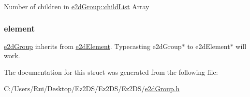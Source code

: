 Number of children in \hyperlink{structe2d_group_a55f6dde874716dc99dcd270fc0999a01}{e2d\-Group\-::child\-List} Array \hypertarget{structe2d_group_a55bc7a3a0af41fba9e5b91f390c5928c}{
\subsubsection[{element}]{ {\bf element}}}\label{structe2d_group_a55bc7a3a0af41fba9e5b91f390c5928c}
\hyperlink{structe2d_group}{e2d\-Group} inherits from \hyperlink{structe2d_element}{e2d\-Element}. Typecasting e2d\-Group$\ast$ to e2d\-Element$\ast$ will work. 

The documentation for this struct was generated from the following file\-:\begin{DoxyCompactItemize}
\item 
C\-:/\-Users/\-Rui/\-Desktop/\-Ez2\-D\-S/\-Ez2\-D\-S/\-Ez2\-D\-S/\hyperlink{e2d_group_8h}{e2d\-Group.\-h}\end{DoxyCompactItemize}
